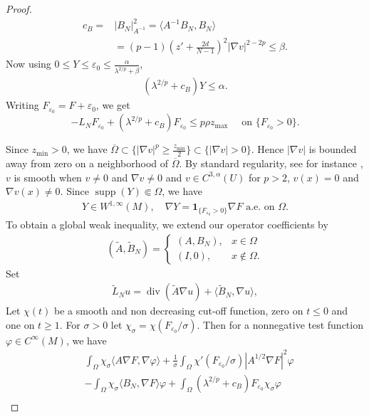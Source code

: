 \documentclass[11pt]{amsart}
\def \eps {\varepsilon}
\DeclareMathOperator{\diver}{div}
\DeclareMathOperator{\supp}{supp}
\theoremstyle{definition}
\begin{document}
\begin{proof}
\begin{align*}
    c_B=&|B_N|_{A^{-1}}^2=\langle A^{-1}B_N,B_N\rangle\\
    &=(p-1)\left(z'+\frac{2d}{N-1}\right)^2|\nabla v|^{2-2p}\leq \beta.
\end{align*}
Now using $0\leq Y \leq \eps_0 \leq \frac{\alpha}{\lambda^{2/p}+\beta}$,
\begin{align*}
    (\lambda^{2/p}+c_B)Y\leq \alpha.
\end{align*}
Writing $F_{\eps_0}=F+\eps_0$, we get
\begin{equation}
    -L_NF_{\eps_0}+(\lambda^{2/p}+c_B)F_{\eps_0}\leq p\rho z_{\max}\quad \text{ on }\{F_{\eps_0}>0\}.
\end{equation}

Since $z_{\min}>0$, we have $\overline{\Omega}\subset \{|\nabla v|^p\geq \frac{z_{\min}}{2}\}\subset \{|\nabla v|>0\}$. Hence $|\nabla v|$ is bounded away from zero on a neighborhood of $\overline{\Omega}$.  By standard regularity, see for instance \cite{Valtorta2012}, $v$ is smooth when $v\neq 0$ and $\nabla v\neq 0$ and $v\in C^{3,\alpha}(U)$ for $p>2$, $v(x)=0$ and $\nabla v(x)\neq 0$.  Since $\supp(Y)\Subset \Omega$, we have
\begin{align*}
    Y\in W^{1,\infty}(M),\quad \nabla Y=\mathbf{1}_{\{F_{\eps_0}>0\}}\nabla F \text{ a.e. on } \Omega.
\end{align*}
To obtain a global weak inequality, we extend our operator coefficients by
\begin{align*}
    (\tilde{A},\tilde{B}_N) = \begin{cases}
        (A,B_N), & x\in\Omega\\
        (I,0), &x \not\in\Omega.
    \end{cases}
\end{align*}
Set
\begin{align*}
    \tilde{L}_Nu=\diver(\tilde{A}\nabla u)+\langle \tilde{B}_N,\nabla u\rangle, 
\end{align*}
Let $\chi(t)$ be a smooth and non decreasing cut-off function, zero on $t\leq 0$ and one on $t\geq 1$.  For $\sigma>0$ let $\chi_\sigma=\chi(F_{\eps_0}/\sigma)$. Then for a nonnegative test function $\varphi \in C^\infty(M)$, we have
\begin{align*}
    &\int_\Omega \chi_\sigma\langle A\nabla F,\nabla \varphi\rangle+\frac{1}{\sigma}\int_\Omega \chi'(F_{\eps_0}/\sigma)|A^{1/2}\nabla F|^2\varphi\\
    &-\int_\Omega \chi_\sigma\langle B_N,\nabla F\rangle \varphi+\int_\Omega(\lambda^{2/p}+c_B)F_{\eps_0}\chi_\sigma \varphi \\

\end{align*}
\end{proof}
\end{document}
